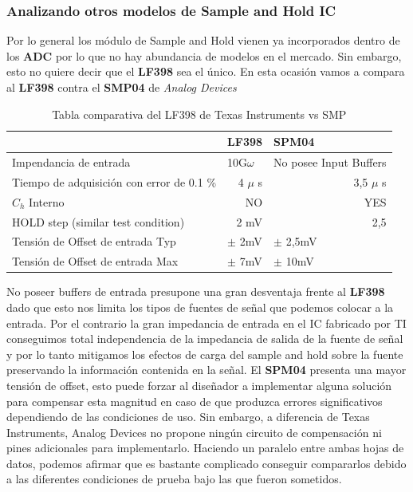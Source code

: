 \subsubsection{Analizando otros modelos de Sample and Hold IC}
Por lo general los módulo de Sample and Hold vienen ya incorporados dentro de los \textbf{ADC} por lo que no hay abundancia de modelos en el mercado. Sin embargo, esto no quiere decir que el \textbf{LF398} sea el único. En esta ocasión vamos a compara al \textbf{LF398} contra el \textbf{SMP04} de \textit{Analog Devices}
\begin{table}[H]
	\centering
	\begin{tabular}{@{}lll@{}}
		\toprule
		& \textbf{LF398}                & \textbf{SPM04}                  \\ \midrule
		Impendancia de entrada                     & 10G$\omega$                   & No posee
		Input Buffers      \\
		Tiempo de adquisición con error de  0.1 \% & \multicolumn{1}{r}{4 $\mu$ s} & \multicolumn{1}{r}{3,5 $\mu$ s} \\
		$C_h$ Interno                              & \multicolumn{1}{r}{NO}        & \multicolumn{1}{r}{YES}         \\
		HOLD step (similar test condition)         & \multicolumn{1}{r}{2 mV}      & \multicolumn{1}{r}{2,5}         \\
		Tensión de Offset de entrada Typ           & $\pm$ 2mV                     & $\pm$ 2,5mV                     \\
		Tensión de Offset de entrada Max           & $\pm$ 7mV                     & $\pm$ 10mV                      \\ \bottomrule
	\end{tabular}
	\caption{Tabla comparativa del LF398 de Texas Instruments vs SMP}
	\label{tab:sampleandholdcomparisson}
\end{table}

No poseer buffers de entrada presupone una gran desventaja frente al \textbf{LF398} dado que esto nos limita los tipos de fuentes de señal que podemos colocar a la entrada. Por el contrario la gran impedancia de entrada en el IC fabricado por TI conseguimos total independencia de la impedancia de salida de la fuente de señal y por lo tanto mitigamos los efectos de carga del sample and hold sobre la fuente preservando la información contenida en la señal.  
El \textbf{SPM04} presenta una mayor tensión de offset, esto puede forzar al diseñador a implementar alguna solución para compensar esta magnitud en caso de que produzca errores significativos dependiendo de las condiciones de uso. Sin embargo, a diferencia de Texas Instruments, Analog Devices no propone ningún circuito de compensación ni pines adicionales para implementarlo. 
Haciendo un paralelo entre ambas hojas de datos, podemos afirmar que es bastante complicado conseguir compararlos debido a las diferentes condiciones de prueba bajo las que fueron sometidos. 


%